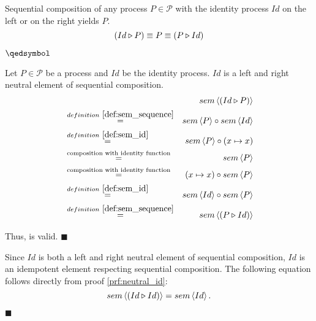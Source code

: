 

\begin{theorem}
\label{thm:idempotence_identity}
Sequential composition of any process $P \in \mathcal{P}$ with the identity process $Id$ on the left or on the right yields $P$.
\begin{equation*}
  \left( Id \triangleright P \right) \equiv P \equiv \left( P \triangleright Id \right)
\end{equation*}

\vspace*{-0.75em}
\hfill$\qedsymbol$
\end{theorem}

\begin{myproof}
\label{prf:neutral_id}
Let $P \in \mathcal{P}$ be a process and $Id$ be the identity process. $Id$ is a left and right neutral element of sequential composition.
\begin{eqnarray*}
  & & \sem{\sequence{Id}{P}} \\
    & \overset{\defref{def:sem_sequence}}{=} & \sem{P} \circ \sem{Id} \\
    & \overset{\defref{def:sem_id}}{=} & \sem{P} \circ \left( x \mapsto x \right) \\
    & \overset{\text{composition with identity function}}{=} & \sem{P} \\
    & \overset{\text{composition with identity function}}{=} & \left( x \mapsto x \right) \circ \sem{P} \\
    & \overset{\defref{def:sem_id}}{=} & \sem{Id} \circ \sem{P} \\
    & \overset{\defref{def:sem_sequence}}{=} & \sem{\sequence{P}{Id}} \\
\end{eqnarray*}

\vspace*{-2em}
Thus,  is valid. \hfill$\blacksquare$
\end{myproof}

\clearpage

\begin{corollary}
Since $Id$ is both a left and right neutral element of sequential composition, $Id$ is an idempotent element respecting sequential composition. The following equation follows directly from proof \ref{prf:neutral_id}:
\begin{equation*}
  sem \left\langle \left( Id \triangleright Id \right) \right\rangle = sem \left\langle Id \right\rangle.
\end{equation*}

\hfill$\blacksquare$
\end{corollary}


